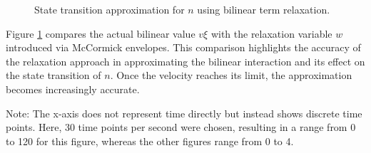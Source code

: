 \begin{figure}[h]
	\centering
	\resizebox{0.7\textwidth}{!}{}
	\caption{State transition approximation for \( n \) using bilinear term relaxation.}
	\label{fig:dn-term-approx}
\end{figure}

Figure \ref{fig:dn-term-approx} compares the actual bilinear value \( v\xi \) with the relaxation variable \( w \) introduced via McCormick
envelopes.
This comparison highlights the accuracy of the relaxation approach in approximating the bilinear interaction and its effect on the state transition
of \( n \).
Once the velocity reaches its limit, the approximation becomes increasingly accurate.

Note: The x-axis does not represent time directly but instead shows discrete time points.
Here, 30 time points per second were chosen, resulting in a range from 0 to 120 for this figure, whereas the other figures range from 0 to 4.

